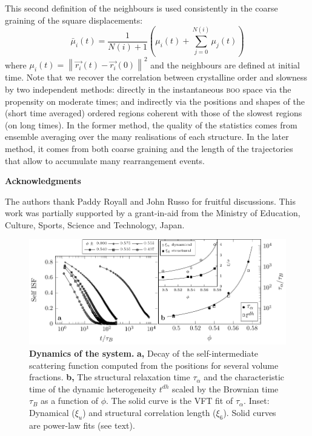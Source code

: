 This second definition of the neighbours is used consistently in the coarse graining of the square displacements:
\begin{equation}
	\bar{\mu}_i(t) = \frac{1}{N(i)+1}\left( \mu_i(t) + \sum_{j=0}^{N(i)} \mu_j(t) \right) 
	\label{eq:Mu}
\end{equation}
where $\mu_i(t) = \left\|\vec{r_i}(t)-\vec{r_i}(0)\right\|^2$ and the neighbours are defined at initial time. Note that we recover the correlation between crystalline order and slowness by two independent methods: directly in the instantaneous \textsc{boo} space via the propensity on moderate times; and indirectly via the positions and shapes of the (short time averaged) ordered regions coherent with those of the slowest regions (on long times). In the former method, the quality of the statistics comes from ensemble averaging over the many realisations of each structure. In the later method, it comes from both coarse graining and the length of the trajectories that allow to accumulate many rearrangement events.

%



\vspace{2cm}
\noindent
\textbf{Acknowledgments}

\noindent
The authors thank Paddy Royall and John Russo for fruitful discussions. 
This work was partially supported by a grant-in-aid from the 
Ministry of Education, Culture, Sports, Science and Technology, Japan. 

\clearpage

\begin{figure}
\begin{center}
\includegraphics{generate_figures-figure0.pdf}
\end{center}
\caption{\textbf{Dynamics of the system.} {\bf a,} Decay of the self-intermediate scattering function computed from the positions for several volume fractions. {\bf b,} The structural relaxation time $\tau_\alpha$ and the characteristic time of the dynamic heterogeneity $t^{dh}$ scaled by the Brownian time $\tau_B$ as a function of $\phi$. The solid curve is the VFT fit of $\tau_\alpha$. Inset: Dynamical ($\xi_u$) and structural correlation length ($\xi_6$). Solid curves are power-law fits (see text).}
	\label{fig:vft}
\end{figure}

